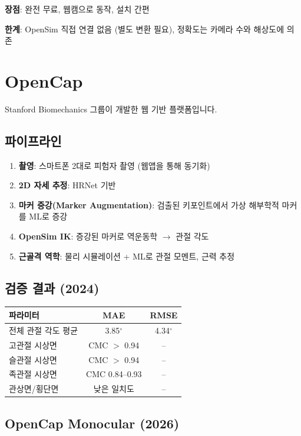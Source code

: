 \documentclass[11pt, a4paper]{report}
\begin{document}
\textbf{장점}: 완전 무료, 웹캠으로 동작, 설치 간편

\textbf{한계}: OpenSim 직접 연결 없음 (별도 변환 필요), 정확도는 카메라 수와 해상도에 의존


\section{OpenCap}

Stanford Biomechanics 그룹이 개발한 웹 기반 플랫폼입니다.

\subsection{파이프라인}

\begin{enumerate}[leftmargin=*]
  \item \textbf{촬영}: 스마트폰 2대로 피험자 촬영 (웹앱을 통해 동기화)
  \item \textbf{2D 자세 추정}: HRNet 기반
  \item \textbf{마커 증강(Marker Augmentation)}: 검출된 키포인트에서 가상 해부학적 마커를 ML로 증강
  \item \textbf{OpenSim IK}: 증강된 마커로 역운동학 $\rightarrow$ 관절 각도
  \item \textbf{근골격 역학}: 물리 시뮬레이션 + ML로 관절 모멘트, 근력 추정
\end{enumerate}

\subsection{검증 결과 (2024)}

\begin{center}
\renewcommand{\arraystretch}{1.3}
\begin{tabular}{lcc}
\toprule
\textbf{파라미터} & \textbf{MAE} & \textbf{RMSE} \\
\midrule
전체 관절 각도 평균 & 3.85$^\circ$ & 4.34$^\circ$ \\
고관절 시상면 & CMC $>$ 0.94 & -- \\
슬관절 시상면 & CMC $>$ 0.94 & -- \\
족관절 시상면 & CMC 0.84--0.93 & -- \\
관상면/횡단면 & 낮은 일치도 & -- \\
\bottomrule
\end{tabular}
\end{center}

\subsection{OpenCap Monocular (2026)}
\end{document}
